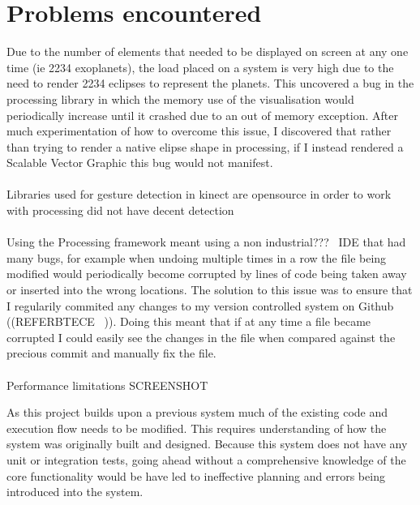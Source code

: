 \section{Problems encountered}
Due to the number of elements that needed to be displayed on screen at any one
time (ie 2234 exoplanets), the load placed on a system is very high due to the
need to render 2234 eclipses to represent the planets. This uncovered a bug in
the processing library in which the memory use of the visualisation would
periodically increase until it crashed due to an out of memory exception. After
much experimentation of how to overcome this issue, I discovered that rather
than trying to render a native elipse shape in processing, if I instead rendered
a Scalable Vector Graphic this bug would not manifest. 
\\\\
Libraries used for gesture detection in kinect are opensource in order to work
with processing did not have decent detection
\\\\
Using the Processing framework meant using a non industrial???~ IDE that had
many bugs, for example when undoing multiple times in a row the file being
modified would periodically become corrupted by lines of code being taken away
or inserted into the wrong locations. The solution to this issue was to ensure
that I regularily commited any changes to my version controlled system on Github
((REFERBTECE ~)). Doing this meant that if at any time a file became corrupted I
could easily see the changes in the file when compared against the precious
commit and manually fix the file. 
\\\\
Performance limitations
SCREENSHOT ~

As this project builds upon a previous system much of the existing code and
execution flow needs to be modified. This requires understanding of how the
system was originally built and designed. Because this system does not have any
unit or integration tests, going ahead without a comprehensive knowledge of the
core functionality would be have led to ineffective planning and errors being
introduced into the system.
